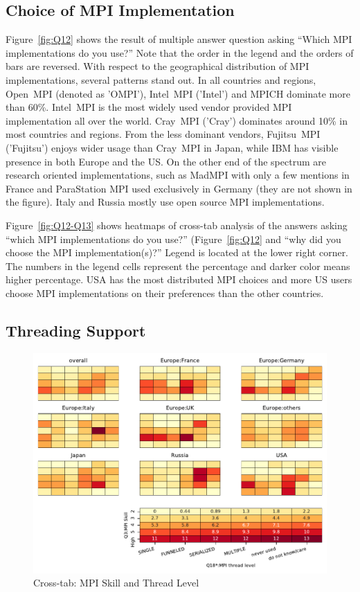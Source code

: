 \documentclass[sigconf,nonacm]{acmart}
\begin{document}
\subsection{Choice of MPI Implementation}

Figure~\ref{fig:Q12} shows the result of multiple answer question
asking ``Which MPI implementations do you use?'' Note that the order
in the legend and the orders of bars are reversed. 
With respect to the geographical distribution of MPI implementations,
several patterns stand out. In all countries and regions, Open~MPI
(denoted as 'OMPI'),
Intel~MPI ('Intel') and MPICH dominate more than 60\%. Intel~MPI is
the most 
widely used vendor provided MPI implementation all over the
world. Cray~MPI ('Cray') dominates around 10\% in most countries and
regions. From the less dominant vendors, Fujitsu~MPI ('Fujitsu')
enjoys wider usage than Cray~MPI in Japan, while IBM has visible
presence in both Europe and the US. 
On the other end of the spectrum are research oriented
implementations, such as MadMPI with only a few mentions in
France and ParaStation MPI used exclusively in
Germany (they are not shown in the figure). Italy and Russia mostly
use open source MPI implementations.

Figure~\ref{fig:Q12-Q13} shows heatmaps of cross-tab analysis of the
answers asking ``which MPI implementations do you use?''
(Figure~\ref{fig:Q12} and ``why did you choose the MPI
implementation(s)?'' Legend is located at the lower right
corner. The numbers in the legend cells represent the
percentage and darker color means higher percentage. USA has the most
distributed MPI choices and more US users choose MPI implementations
on their preferences than the other countries.
  
\subsection{Threading Support}

\begin{figure}[htb]
\begin{center}
\includegraphics[width=0.8\hsize]{figs/Q3-Q18.pdf}
\caption{Cross-tab: MPI Skill and Thread Level}%
\label{fig:Q3-Q18}
\end{center}
\end{figure}
\end{document}

